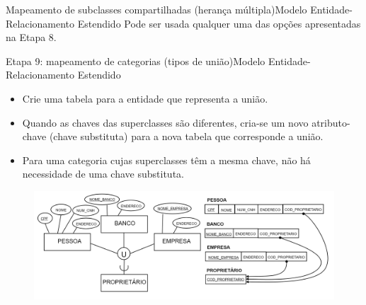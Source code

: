 \documentclass[t]{beamer}
\begin{document}

\begin{ftst}{Mapeamento de subclasses compartilhadas (herança múltipla)}{Modelo Entidade-Relacionamento Estendido}
\small
Pode ser usada qualquer uma das opções apresentadas na Etapa 8.


\end{ftst}


\begin{ftst}{Etapa 9: mapeamento de categorias (tipos de união)}{Modelo Entidade-Relacionamento Estendido}
\small
\begin{itemize}
    \item Crie uma tabela para a entidade que representa a união.
    \item Quando as chaves das superclasses são diferentes, cria-se um novo atributo-chave (chave substituta) para a nova tabela que corresponde a união.
    \item Para uma categoria cujas superclasses têm a mesma chave, não há necessidade de uma chave substituta.
\end{itemize}

\begin{figure}
    \centering
    \includegraphics[scale=0.11]{Figuras/03_17.png}
\end{figure}
\end{ftst}

\end{document}
